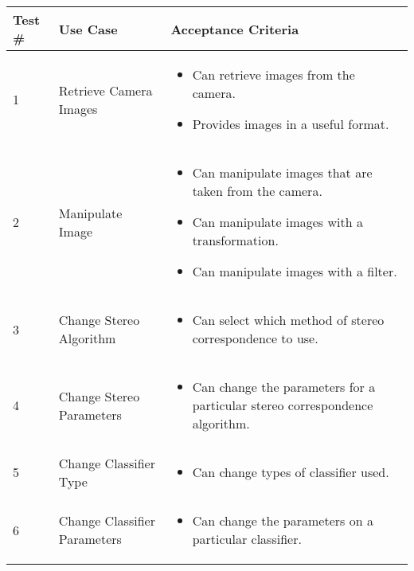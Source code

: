 \begin{center}
\small
\begin{longtable}{p{}|p{}|p{}}
\hline
\textbf{Test \#} & \textbf{Use Case}            & \textbf{Acceptance Criteria} \\ \hline
1                & Retrieve Camera Images       &  \begin{itemize}
												  	\item Can retrieve images from the camera.
												  	\item Provides images in a useful format.
												  \end{itemize}             \\ \hline
2                & Manipulate Image             &  \begin{itemize}
												  	\item Can manipulate images that are taken from the camera.
												  	\item Can manipulate images with a transformation.
												  	\item Can manipulate images with a filter.
												  \end{itemize}                             \\ \hline
3                & Change Stereo Algorithm      &  \begin{itemize}
												  	\item Can select which method of stereo correspondence to use.
												  \end{itemize}                             \\ \hline
4                & Change Stereo Parameters     &  \begin{itemize}
												  	\item Can change the parameters for a particular stereo correspondence algorithm.
												  \end{itemize}                             \\ \hline
5                & Change Classifier Type       &  \begin{itemize}
												  	\item Can change types of classifier used.
												  \end{itemize}                             \\ \hline
6                & Change Classifier Parameters &  \begin{itemize}
												  	\item Can change the parameters on a particular classifier.

\end{itemize}
\end{longtable}
\end{center}
